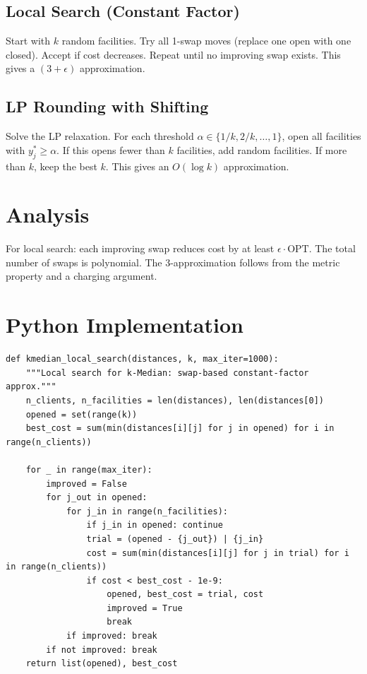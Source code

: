 \subsection{Local Search (Constant Factor)}
Start with $k$ random facilities. Try all 1-swap moves (replace one open with one closed). Accept if cost decreases. Repeat until no improving swap exists. This gives a $(3 + \epsilon)$ approximation.

\subsection{LP Rounding with Shifting}
Solve the LP relaxation. For each threshold $\alpha \in \{1/k, 2/k, \dots, 1\}$, open all facilities with $y_j^* \ge \alpha$. If this opens fewer than $k$ facilities, add random facilities. If more than $k$, keep the best $k$. This gives an $O(\log k)$ approximation.

\section{Analysis}
For local search: each improving swap reduces cost by at least $\epsilon \cdot \text{OPT}$. The total number of swaps is polynomial. The 3-approximation follows from the metric property and a charging argument.

\section{Python Implementation}

\begin{lstlisting}[style=python, caption=k-Median Local Search]
def kmedian_local_search(distances, k, max_iter=1000):
    """Local search for k-Median: swap-based constant-factor approx."""
    n_clients, n_facilities = len(distances), len(distances[0])
    opened = set(range(k))
    best_cost = sum(min(distances[i][j] for j in opened) for i in range(n_clients))
    
    for _ in range(max_iter):
        improved = False
        for j_out in opened:
            for j_in in range(n_facilities):
                if j_in in opened: continue
                trial = (opened - {j_out}) | {j_in}
                cost = sum(min(distances[i][j] for j in trial) for i in range(n_clients))
                if cost < best_cost - 1e-9:
                    opened, best_cost = trial, cost
                    improved = True
                    break
            if improved: break
        if not improved: break
    return list(opened), best_cost
\end{lstlisting}

